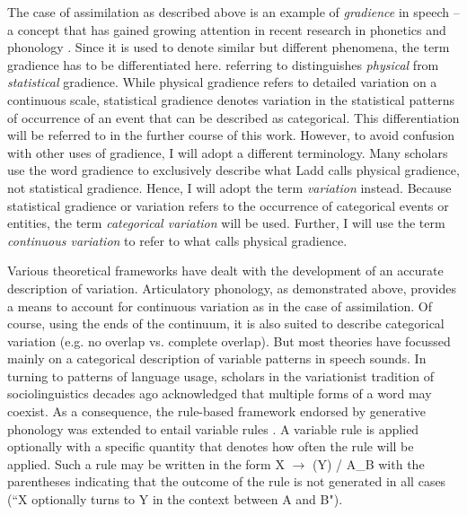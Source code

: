 The case of assimilation as described above is an example of \emph{gradience} in speech -- a concept that has gained growing attention in recent research in phonetics and phonology \citep{Cohn2006}. Since it is used to denote similar but different phenomena, the term gradience has to be differentiated here. \cite{Ladd2014} referring to \cite{Bolinger1961} distinguishes \emph{physical} from \emph{statistical} gradience. While physical gradience refers to detailed variation on a continuous scale, statistical gradience denotes variation in the statistical patterns of occurrence of an event that can be described as categorical. This differentiation will be referred to in the further course of this work. However, to avoid confusion with other uses of gradience, I will adopt a different terminology. Many scholars use the word gradience to exclusively describe what Ladd calls physical gradience, not statistical gradience. Hence, I will adopt the term \emph{variation} instead. Because statistical gradience or variation refers to the occurrence of categorical events or entities, the term \emph{categorical variation} will be used. Further, I will use the term \emph{continuous variation} to refer to what \cite{Ladd2014} calls physical gradience. 

Various theoretical frameworks have dealt with the development of an accurate description of variation. Articulatory phonology, as demonstrated above, provides a means to account for continuous variation as in the case of assimilation. Of course, using the ends of the continuum, it is also suited to describe categorical variation (e.g. no overlap vs. complete overlap). But most theories have focussed mainly on a categorical description of variable patterns in speech sounds. In turning to patterns of language usage, scholars in the variationist tradition of sociolinguistics decades ago acknowledged that multiple forms of a word may coexist. As a consequence, the rule-based framework endorsed by generative phonology was extended to entail variable rules \citep{Labov1969,CedergrenSankoff1974,Anttila2007}. A variable rule is applied optionally with a specific quantity that denotes how often the rule will be applied. Such a rule may be written in the form X $\rightarrow$ (Y) / A\_B with the parentheses indicating that the outcome of the rule is not generated in all cases (``X optionally turns to Y in the context between A and B").

